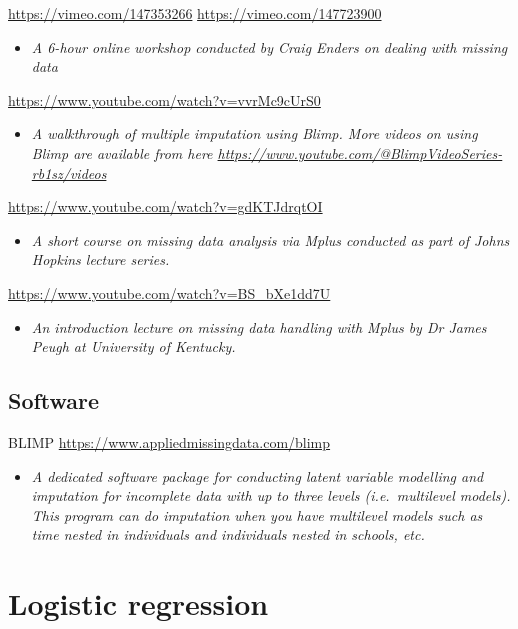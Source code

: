 \documentclass[
]{book}
\providecommand{\tightlist}{%
  \setlength{\itemsep}{0pt}\setlength{\parskip}{0pt}}
\begin{document}
\url{https://vimeo.com/147353266}
\url{https://vimeo.com/147723900}

\begin{itemize}
\tightlist
\item
  \emph{A 6-hour online workshop conducted by Craig Enders on dealing with missing data}
\end{itemize}

\url{https://www.youtube.com/watch?v=vvrMc9cUrS0}

\begin{itemize}
\tightlist
\item
  \emph{A walkthrough of multiple imputation using Blimp. More videos on using Blimp are available from here \url{https://www.youtube.com/@BlimpVideoSeries-rb1sz/videos} }
\end{itemize}

\url{https://www.youtube.com/watch?v=gdKTJdrqtOI}

\begin{itemize}
\tightlist
\item
  \emph{A short course on missing data analysis via Mplus conducted as part of Johns Hopkins lecture series. }
\end{itemize}

\url{https://www.youtube.com/watch?v=BS_bXe1dd7U}

\begin{itemize}
\tightlist
\item
  \emph{An introduction lecture on missing data handling with Mplus by Dr James Peugh at University of Kentucky.}
\end{itemize}

\section{Software}\label{software-1}

BLIMP \url{https://www.appliedmissingdata.com/blimp}

\begin{itemize}
\tightlist
\item
  \emph{A dedicated software package for conducting latent variable modelling and imputation for incomplete data with up to three levels (i.e.~multilevel models). This program can do imputation when you have multilevel models such as time nested in individuals and individuals nested in schools, etc. }
\end{itemize}

\chapter{Logistic regression}\label{logistic-regression}
\end{document}
